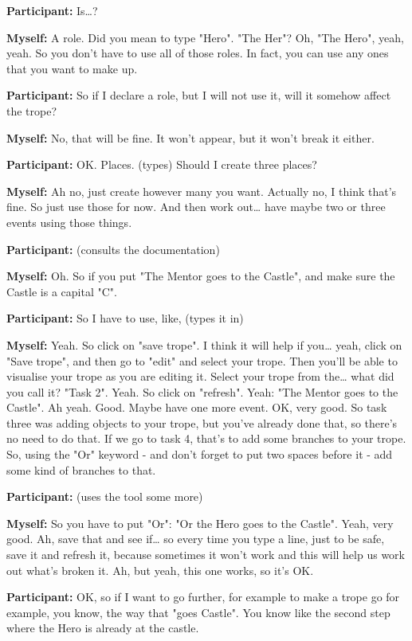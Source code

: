 \documentclass[11pt]{report}
\newcommand{\llabel}[1]{\hypertarget{llineno:#1}{\linelabel{#1}}}
\begin{document}
\begin{linenumbers}
\textbf{Participant:} Is\ldots{}?

\textbf{Myself:} A role. Did you mean to type "Hero". "The Her"? Oh, "The Hero", yeah, yeah. So you don't have to use all of those roles. In fact, you can use any ones that you want to make up.

\textbf{Participant:} So if I declare a role, but I will not use it, will it somehow affect the trope?

\textbf{Myself:} No, that will be fine. It won't appear, but it won't break it either.

\textbf{Participant:} OK. Places. (types) Should I create three places?

\textbf{Myself:} Ah no, just create however many you want. Actually no, I think that's fine. So just use those for now. And then work out\ldots{} have maybe two or three events using those things.

\textbf{Participant:} (consults the documentation)

\textbf{Myself:} Oh. So if you put "The Mentor goes to the Castle", and make sure the Castle is a capital "C".\llabel{lne:syntax5f2}

\textbf{Participant:} So I have to use, like, (types it in)

\textbf{Myself:} Yeah. So click on "save trope". I think it will help if you\ldots{} yeah, click on "Save trope", and then go to "edit" and select your trope. Then you'll be able to visualise your trope as you are editing it. Select your trope from the\ldots{} what did you call it? "Task 2". Yeah. So click on "refresh". Yeah: "The Mentor goes to the Castle". Ah yeah. Good. Maybe have one more event. OK, very good. So task three was adding objects to your trope, but you've already done that, so there's no need to do that. If we go to task 4, that's to add some branches to your trope. So, using the "Or" keyword - and don't forget to put two spaces before it - add some kind of branches to that.

\textbf{Participant:} (uses the tool some more)

\textbf{Myself:} So you have to put "Or": "Or the Hero goes to the Castle". Yeah, very good. Ah, save that and see if\ldots{} so every time you type a line, just to be safe, save it and refresh it, because sometimes it won't work and this will help us work out what's broken it. Ah, but yeah, this one works, so it's OK.

\textbf{Participant:} OK, so if I want to go further, for example to make a
trope go for example, you know, the way that "goes Castle". You know like the
second step where the Hero is already at the castle.\llabel{lne:bug2f}


\end{linenumbers}
\end{document}
